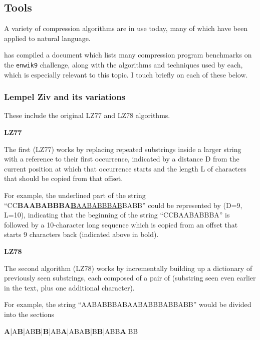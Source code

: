 \subsection{Tools}


A variety of compression algorithms are in use today, many of which have been applied to natural language.

\textcite{Mahoney2011} has compiled a document which lists many compression program benchmarks on the \texttt{enwik9} challenge, along with the algorithms and techniques used by each, which is especially relevant to this topic. I touch briefly on each of these below.

\subsubsection{Lempel Ziv and its variations}
These include the original LZ77 \autocite{Ziv1977} and LZ78 \autocite{Ziv1978} algorithms.

\textbf{LZ77}

The first (LZ77) works by replacing repeated substrings inside a larger string with a reference to their first occurrence, indicated by a distance D from the current position at which that occurrence starts and the length L of characters that should be copied from that offset.

For example, the underlined part of the string “CC\textbf{BAABABBBA\underline{B}}\underline{AABABBBAB}BABB” could be represented by (D=9, L=10), indicating that the beginning of the string “CCBAABABBBA” is followed by a 10-character long sequence which is copied from an offset that starts 9 characters back (indicated above in bold).

\textbf{LZ78}

The second algorithm (LZ78) works by incrementally building up a dictionary of previously seen substrings, each composed of a pair of (substring seen even earlier in the text, plus one additional character).

For example, the string “AABABBBABAABABBBABBABB” would be divided into the sections

\begin{center}
\textbf{A}|A\textbf{B}|AB\textbf{B}|\textbf{B}|AB\textbf{A}|ABA\textbf{B}|B\textbf{B}|ABB\textbf{A}|BB
\end{center}

